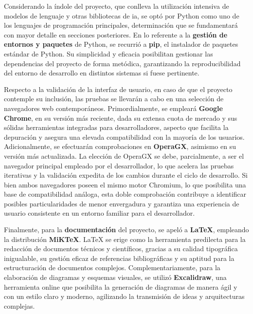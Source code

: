 Considerando la índole del proyecto, que conlleva la utilización intensiva de modelos de lenguaje y otras bibliotecas de \gls{ia}, se optó por Python como uno de los lenguajes de programación principales, determinación que se fundamentará con mayor detalle en secciones posteriores. En lo referente a la \textbf{gestión de entornos y paquetes} de Python, se recurrió a \textbf{pip}, el instalador de paquetes estándar de Python. Su simplicidad y eficacia posibilitan gestionar las dependencias del proyecto de forma metódica, garantizando la reproducibilidad del entorno de desarrollo en distintos sistemas si fuese pertinente.

Respecto a la validación de la interfaz de usuario, en caso de que el proyecto contemple su inclusión, las pruebas se llevarán a cabo en una selección de navegadores web contemporáneos. Primordialmente, se empleará \textbf{Google Chrome}, en su versión más reciente, dada su extensa cuota de mercado y sus sólidas herramientas integradas para desarrolladores, aspecto que facilita la depuración y asegura una elevada compatibilidad con la mayoría de los usuarios. Adicionalmente, se efectuarán comprobaciones en \textbf{OperaGX}, asimismo en su versión más actualizada. La elección de OperaGX se debe, parcialmente, a ser el navegador principal empleado por el desarrollador, lo que acelera las pruebas iterativas y la validación expedita de los cambios durante el ciclo de desarrollo. Si bien ambos navegadores poseen el mismo motor Chromium, lo que posibilita una base de compatibilidad análoga, esta doble comprobación contribuye a identificar posibles particularidades de menor envergadura y garantiza una experiencia de usuario consistente en un entorno familiar para el desarrollador.

Finalmente, para la \textbf{documentación} del proyecto, se apeló a \textbf{LaTeX}, empleando la distribución \textbf{MiKTeX}. LaTeX se erige como la herramienta predilecta para la redacción de documentos técnicos y científicos, gracias a su calidad tipográfica inigualable, su gestión eficaz de referencias bibliográficas y su aptitud para la estructuración de documentos complejos. Complementariamente, para la elaboración de diagramas y esquemas visuales, se utilizó \textbf{Excalidraw}, una herramienta online que posibilita la generación de diagramas de manera ágil y con un estilo claro y moderno, agilizando la transmisión de ideas y arquitecturas complejas.
